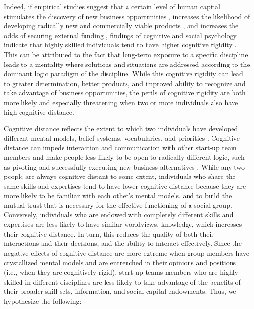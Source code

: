 \documentclass[12pt]{article}
\begin{document}
Indeed, if empirical studies suggest that a certain level of human capital stimulates the discovery of new business opportunities \citep{shane2000promise, marvel2016human}, increases the likelihood of developing radically new and commercially viable products \citep{marvel2007technology}, and increases the odds of securing external funding \citep{beckman2007early}, findings of cognitive and social psychology indicate that highly skilled individuals tend to have higher cognitive rigidity \citep{pierce2013too}. This can be attributed to the fact that long-term exposure to a specific discipline leads to a mentality where solutions and situations are addressed according to the dominant logic paradigm of the discipline. While this cognitive rigidity can lead to greater determination, better products, and improved ability to recognize and take advantage of business opportunities, the perils of cognitive rigidity are both more likely and especially threatening when two or more individuals also have high cognitive distance.

Cognitive distance reflects the extent to which two individuals have developed different mental models, belief systems, vocabularies, and priorities \citep{nooteboom2007optimal}. Cognitive distance can impede interaction and communication with other start-up team members and make people less likely to be open to radically different logic, such as pivoting and successfully executing new business alternatives \citep{kirtley2020pivot}. While any two people are always cognitive distant to some extent, individuals who share the same skills and expertises tend to have lower cognitive distance because they are more likely to be familiar with each other’s mental models, and to build the mutual trust that is necessary for the effective functioning of a social group. Conversely, individuals who are endowed with completely different skills and expertises are less likely to have similar worldviews, knowledge, which increases their cognitive distance. In turn, this reduces the quality of both their interactions and their decisions, and the ability to interact effectively. Since the negative effects of cognitive distance are more extreme when group members have crystallized mental models and are entrenched in their opinions and positions (i.e., when they are cognitively rigid), start-up teams members who are highly skilled in different disciplines are less likely to take advantage of the benefits of their broader skill sets, information, and social capital endowments. Thus, we hypothesize the following: \\
\end{document}
